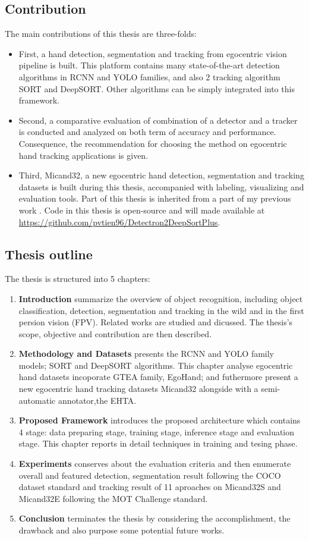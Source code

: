 \subsection{Contribution}
The main contributions of this thesis are three-folds:
\begin{itemize}
	\item First, a hand detection, segmentation and tracking from egocentric vision pipeline is built. This platform contains many state-of-the-art detection algorithms in RCNN and YOLO families, and also 2 tracking algorithm SORT and DeepSORT. Other algorithms can be simply integrated into this framework.
	\item Second, a comparative evaluation of combination of a detector and a tracker is conducted and analyzed on both term of accuracy and performance. Consequence, the recommendation for choosing the method on egocentric hand tracking applications is given.
	\item Third, Micand32, a new egocentric hand detection, segmentation and tracking datasets is built during this thesis, accompanied with labeling, visualizing and evaluation tools.
	Part of this thesis is inherited from a part of my previous work \cite{tien}. Code in this thesis is open-source and will made available at  \url{https://github.com/pvtien96/Detectron2DeepSortPlus}.
\end{itemize}
\subsection{Thesis outline}
The thesis is structured into 5 chapters:
\begin{enumerate}
	\item \textbf{Introduction} summarize the overview of object recognition, including object classification, detection, segmentation and tracking in the wild and in the first persion vision (FPV). Related works are studied and dicussed. The thesis's scope, objective and contribution are then described.
	\item \textbf{Methodology and Datasets} presents the RCNN and YOLO family models; SORT and DeepSORT algorithms. This chapter analyse egocentric hand datasets incoporate GTEA family, EgoHand; and futhermore present a new egocentric hand tracking datasets Micand32 alongside with a semi-automatic annotator,the EHTA.
	\item \textbf{Proposed Framework} introduces the proposed architecture which contains 4 stage: data preparing stage, training stage, inference stage and evaluation stage. This chapter reports in detail techniques in training and tesing phase.
	\item \textbf{Experiments} conserves about the evaluation criteria and then enumerate overall and featured detection, segmentation result following the COCO dataset standard and tracking result of 11 aproaches on Micand32S and Micand32E following the MOT Challenge standard. 
	\item \textbf{Conclusion} terminates the thesis by considering the accomplishment, the drawback and also purpose some potential future works.
\end{enumerate}